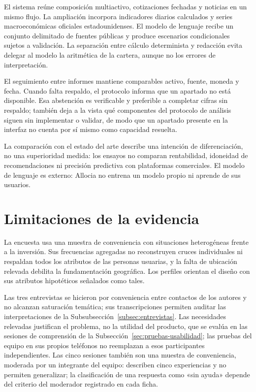 El sistema reúne composición multiactivo, cotizaciones fechadas y noticias en un mismo flujo. La ampliación incorpora indicadores diarios calculados y series macroeconómicas oficiales estadounidenses. El modelo de lenguaje recibe un conjunto delimitado de fuentes públicas y produce escenarios condicionales sujetos a validación. La separación entre cálculo determinista y redacción evita delegar al modelo la aritmética de la cartera, aunque no los errores de interpretación.

El seguimiento entre informes mantiene comparables activo, fuente, moneda y fecha. Cuando falta respaldo, el protocolo informa que un apartado no está disponible. Esa abstención es verificable y preferible a completar cifras sin respaldo; también deja a la vista qué componentes del protocolo de análisis siguen sin implementar o validar, de modo que un apartado presente en la interfaz no cuenta por sí mismo como capacidad resuelta.

La comparación con el estado del arte describe una intención de diferenciación, no una superioridad medida: los ensayos no comparan rentabilidad, idoneidad de recomendaciones ni precisión predictiva con plataformas comerciales. El modelo de lenguaje es externo: Allocia no entrena un modelo propio ni aprende de sus usuarios.

\section{Limitaciones de la evidencia}\label{sec:limitaciones-encontradas}

La encuesta usa una muestra de conveniencia con situaciones heterogéneas frente a la inversión. Sus frecuencias agregadas no reconstruyen cruces individuales ni respaldan todos los atributos de las personas usuarias, y la falta de ubicación relevada debilita la fundamentación geográfica. Los perfiles orientan el diseño con sus atributos hipotéticos señalados como tales.

Las tres entrevistas se hicieron por conveniencia entre contactos de los autores y no alcanzan saturación temática; sus transcripciones permiten auditar las interpretaciones de la Subsubsección~\ref{subsec:entrevistas}. Las necesidades relevadas justifican el problema, no la utilidad del producto, que se evalúa en las sesiones de comprensión de la Subsección~\ref{sec:pruebas-usabilidad}; las pruebas del equipo en sus propios teléfonos no reemplazan a esos participantes independientes. Las cinco sesiones también son una muestra de conveniencia, moderada por un integrante del equipo: describen cinco experiencias y no permiten generalizar; la clasificación de una respuesta como «sin ayuda» depende del criterio del moderador registrado en cada ficha.

